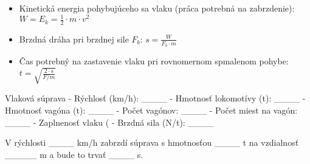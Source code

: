 \begin{itemize}
\itemsep0pt
\item Kinetická energia pohybujúceho sa vlaku (práca potrebná na zabrzdenie): $ W = E_k = \frac{1}{2} \cdot m \cdot v^2 $
\item Brzdná dráha pri brzdnej sile $F_b$: $ s = \frac{W}{F_b \cdot m} $
\item Čas potrebný na zastavenie vlaku pri rovnomernom spmalenom pohybe: $ t = \sqrt{\frac{2 \cdot s}{F / m}} $
\end{itemize}

\begin{code}
Vlaková súprava
- Rýchlosť (km/h): ____
- Hmotnosť lokomotívy (t): ____
- Hmotnosť vagóna (t): ____
- Počet vagónov: ____
- Počet miest na vagón: ____
- Zaplnenosť vlaku (%
- Brzdná sila (N/t): ____

V rýchlosti ____ km/h zabrzdí súprava s hmotnosťou ____ t na vzdialnosť _____ m a bude to trvať ____ s.
\end{code} 
